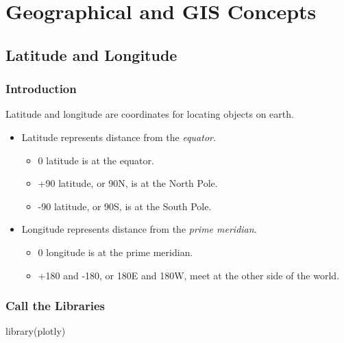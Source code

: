\documentclass[
  letterpaper,
  DIV=11,
  numbers=noendperiod,
  oneside]{scrreprt}
\newenvironment{Shaded}{\begin{snugshade}}{\end{snugshade}}
\newcommand{\FunctionTok}[1]{\textcolor[rgb]{0.28,0.35,0.67}{#1}}
\newcommand{\NormalTok}[1]{\textcolor[rgb]{0.00,0.23,0.31}{#1}}
\providecommand{\tightlist}{%
  \setlength{\itemsep}{0pt}\setlength{\parskip}{0pt}}\usepackage{longtable,booktabs,array}
\begin{document}
\part{Geographical and GIS Concepts}

\chapter{Latitude and Longitude}\label{latitude-and-longitude}

\section{Introduction}\label{introduction-1}

Latitude and longitude are coordinates for locating objects on earth.

\begin{itemize}
\tightlist
\item
  Latitude represents distance from the \emph{equator}.

  \begin{itemize}
  \tightlist
  \item
    0 latitude is at the equator.
  \item
    +90 latitude, or 90N, is at the North Pole.
  \item
    -90 latitude, or 90S, is at the South Pole.
  \end{itemize}
\item
  Longitude represents distance from the \emph{prime meridian}.

  \begin{itemize}
  \tightlist
  \item
    0 longitude is at the prime meridian.
  \item
    +180 and -180, or 180E and 180W, meet at the other side of the
    world.
  \end{itemize}
\end{itemize}

\section{Call the Libraries}\label{call-the-libraries}

\begin{Shaded}
\begin{Highlighting}[]
\FunctionTok{library}\NormalTok{(plotly)}
\end{Highlighting}
\end{Shaded}
\end{document}
